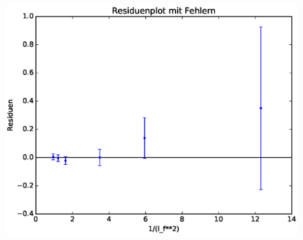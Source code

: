 \documentclass[11pt]{beamer}
\begin{document}
\begin{frame}
\begin{figure}[H]
\centering
\includegraphics[scale=0.5]{Bilder/Bestimmung_D_Residuen.eps}
\end{figure}
\end{frame}
\end{document}
